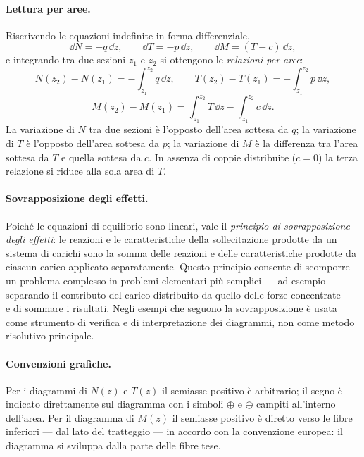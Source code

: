 \paragraph{Lettura per aree.}
Riscrivendo le equazioni indefinite in forma
differenziale,
\begin{equation}
	\dd N = -q\,\dd z, \qquad \dd T = -p\,\dd z,
	\qquad \dd M = (T-c)\,\dd z,
\end{equation}
e integrando tra due sezioni $z_1$ e $z_2$
si ottengono le \emph{relazioni per aree}:
\begin{equation}
	N(z_2)-N(z_1) = -\int_{z_1}^{z_2} q\,\dd z,
	\qquad
	T(z_2)-T(z_1) = -\int_{z_1}^{z_2} p\,\dd z,
\end{equation}
\begin{equation}
	M(z_2)-M(z_1) = \int_{z_1}^{z_2} T\,\dd z
	- \int_{z_1}^{z_2} c\,\dd z.
\end{equation}
La variazione di $N$ tra due sezioni è l'opposto
dell'area sottesa da $q$; la variazione di $T$
è l'opposto dell'area sottesa da $p$; la
variazione di $M$ è la differenza tra l'area
sottesa da $T$ e quella sottesa da $c$. In
assenza di coppie distribuite ($c=0$) la terza
relazione si riduce alla sola area di $T$.

\paragraph{Sovrapposizione degli effetti.}
Poiché le equazioni di equilibrio sono lineari,
vale il \emph{principio di sovrapposizione degli
	effetti}: le reazioni e le caratteristiche della
sollecitazione prodotte da un sistema di carichi
sono la somma delle reazioni e delle caratteristiche
prodotte da ciascun carico applicato separatamente.
Questo principio consente di scomporre un problema
complesso in problemi elementari più semplici ---
ad esempio separando il contributo del carico
distribuito da quello delle forze concentrate ---
e di sommare i risultati. Negli esempi che seguono
la sovrapposizione è usata come strumento di verifica
e di interpretazione dei diagrammi, non come metodo
risolutivo principale.


\paragraph{Convenzioni grafiche.}
Per i diagrammi di $N(z)$ e $T(z)$ il semiasse
positivo è arbitrario; il segno è indicato
direttamente sul diagramma con i simboli $\oplus$
e $\ominus$ campiti all'interno dell'area.
Per il diagramma di $M(z)$ il semiasse positivo
è diretto verso le fibre inferiori --- dal lato
del tratteggio --- in accordo con la convenzione
europea: il diagramma si sviluppa dalla parte
delle fibre tese.


